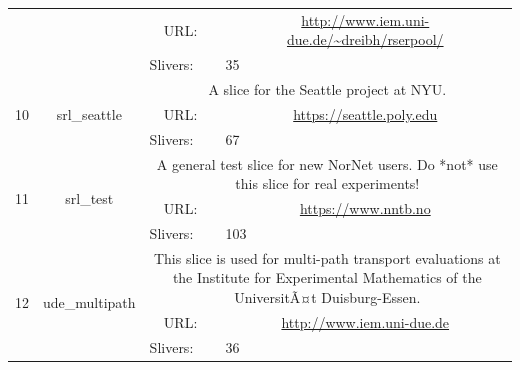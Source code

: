 \begin{small}
\begin{center}
\begin{longtable}{|c|c|c|c|}
  &  & \multicolumn{1}{|p{5em}|}{URL:} & \multicolumn{1}{|p{22.5em}|}{\url{http://www.iem.uni-due.de/~dreibh/rserpool/}} \\* \cline{3-3}\cline{4-4}
  &  & \multicolumn{1}{|l|}{Slivers:} & \multicolumn{1}{|l|}{35} \\ \hline
 \multirow{3}{*}{10} & \multirow{3}{*}{\index{srl\_seattle}\index{Slice!srl\_seattle}srl\_seattle} & \multicolumn{2}{|p{30em}|}{A slice for the Seattle project at NYU.} \\* \cline{3-3}\cline{4-4}
  &  & \multicolumn{1}{|p{5em}|}{URL:} & \multicolumn{1}{|p{22.5em}|}{\url{https://seattle.poly.edu}} \\* \cline{3-3}\cline{4-4}
  &  & \multicolumn{1}{|l|}{Slivers:} & \multicolumn{1}{|l|}{67} \\ \hline
 \multirow{3}{*}{11} & \multirow{3}{*}{\index{srl\_test}\index{Slice!srl\_test}srl\_test} & \multicolumn{2}{|p{30em}|}{A general test slice for new NorNet users. Do *not* use this slice for real experiments!} \\* \cline{3-3}\cline{4-4}
  &  & \multicolumn{1}{|p{5em}|}{URL:} & \multicolumn{1}{|p{22.5em}|}{\url{https://www.nntb.no}} \\* \cline{3-3}\cline{4-4}
  &  & \multicolumn{1}{|l|}{Slivers:} & \multicolumn{1}{|l|}{103} \\ \hline
 \multirow{3}{*}{12} & \multirow{3}{*}{\index{ude\_multipath}\index{Slice!ude\_multipath}ude\_multipath} & \multicolumn{2}{|p{30em}|}{This slice is used for multi-path transport evaluations at the Institute for Experimental Mathematics of the UniversitÃ¤t Duisburg-Essen.} \\* \cline{3-3}\cline{4-4}
  &  & \multicolumn{1}{|p{5em}|}{URL:} & \multicolumn{1}{|p{22.5em}|}{\url{http://www.iem.uni-due.de}} \\* \cline{3-3}\cline{4-4}
  &  & \multicolumn{1}{|l|}{Slivers:} & \multicolumn{1}{|l|}{36} \\ \hline
\end{longtable}
\end{center}
\end{small}
